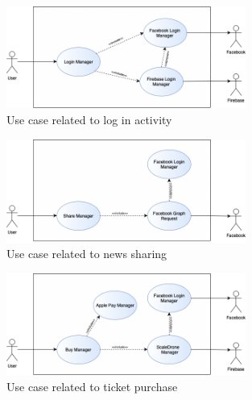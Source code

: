 \documentclass[numbers=noenddot, 12pt, a4paper, oneside]{scrbook}
\begin{document}
\begin{figure}[H]
	\centering
	\includegraphics[width=0.7\textwidth]{images/Login}
	\caption{Use case related to log in activity}
\end{figure}
\begin{figure}[H]
	\centering
	\includegraphics[width=0.7\textwidth]{images/Share}
	\caption{Use case related to news sharing}
\end{figure}
\begin{figure}[H]
	\centering
	\includegraphics[width=0.7\textwidth]{images/Buy}
	\caption{Use case related to ticket purchase}
\end{figure}
\end{document}
